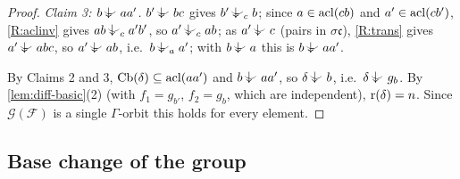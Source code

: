 \begin{proof}
\emph{Claim 3: $b\ind{}aa'$.}  $b'\ind{}bc$ gives $b'\ind{c}b$; since $a\in\operatorname{acl}(cb)$ and
$a'\in\operatorname{acl}(cb')$, \ref{R:aclinv} gives $ab\ind{c}a'b'$, so $a'\ind{c}ab$; as $a'\ind{}c$
(pairs in $\sigma\mathfrak c$), \ref{R:trans} gives $a'\ind{}abc$, so $a'\ind{}ab$, i.e.\
$b\ind{a}a'$; with $b\ind{}a$ this is $b\ind{}aa'$.

By Claims 2 and 3, $\operatorname{Cb}(\delta)\subseteq\operatorname{acl}(aa')$ and $b\ind{}aa'$, so $\delta\ind{}b$,
i.e.\ $\delta\ind{}g_b$.  By \cref{lem:diff-basic}(2) (with $f_1=g_{b'}$, $f_2=g_b$,
which are independent), $\operatorname{r}(\delta)=n$.  Since $\mathcal G(\mathcal F)$ is a single
$\Gamma$-orbit this holds for every element.
\end{proof}

\subsection{Base change of the group}

